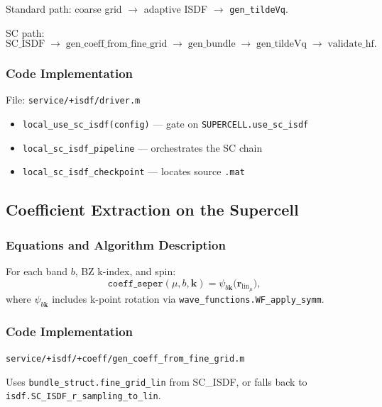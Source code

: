\documentclass[11pt,a4paper]{article}
\begin{document}
Standard path: coarse grid $\to$ adaptive ISDF $\to$ \texttt{gen\_tildeVq}.

SC path:
\[
  \text{SC\_ISDF}
  \;\to\; \text{gen\_coeff\_from\_fine\_grid}
  \;\to\; \text{gen\_bundle}
  \;\to\; \text{gen\_tildeVq}
  \;\to\; \text{validate\_hf}.
\]

\subsubsection{Code Implementation}

File: \texttt{service/+isdf/driver.m}
\begin{itemize}
  \item \texttt{local\_use\_sc\_isdf(config)} --- gate on \texttt{SUPERCELL.use\_sc\_isdf}
  \item \texttt{local\_sc\_isdf\_pipeline} --- orchestrates the SC chain
  \item \texttt{local\_sc\_isdf\_checkpoint} --- locates source \texttt{.mat}
\end{itemize}

\subsection{Coefficient Extraction on the Supercell}

\subsubsection{Equations and Algorithm Description}

For each band $b$, BZ k-index, and spin:
\begin{equation}
  \texttt{coeff\_seper}(\mu,b,\mathbf k)
  = \psi_{b\mathbf k}\!\bigl(\mathbf r_{\mathrm{lin}_\mu}\bigr),
\end{equation}
where $\psi_{b\mathbf k}$ includes k-point rotation via
\texttt{wave\_functions.WF\_apply\_symm}.

\subsubsection{Code Implementation}

\texttt{service/+isdf/+coeff/gen\_coeff\_from\_fine\_grid.m}

Uses \texttt{bundle\_struct.fine\_grid\_lin} from SC\_ISDF, or falls back to
\texttt{isdf.SC\_ISDF\_r\_sampling\_to\_lin}.
\end{document}

